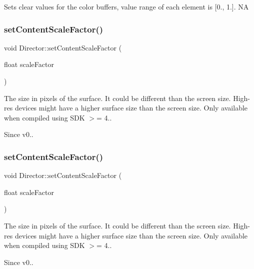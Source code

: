 Sets clear values for the color buffers, value range of each element is \mbox{[}0., 1.\mbox{]}.  NA \mbox{\label{classDirector_a0eef2543f7619fc1539a22b6cfe42acb}} 
\subsubsection{\texorpdfstring{set\+Content\+Scale\+Factor()}{setContentScaleFactor()}\hspace{0.1cm}{\footnotesize\ttfamily [1/2]}}
{\footnotesize\ttfamily void Director\+::set\+Content\+Scale\+Factor (\begin{DoxyParamCaption}\item[{float}]{scale\+Factor }\end{DoxyParamCaption})}

The size in pixels of the surface. It could be different than the screen size. High-\/res devices might have a higher surface size than the screen size. Only available when compiled using S\+DK $>$= 4.. \begin{DoxySince}{Since}
v0.. 
\end{DoxySince}
\mbox{\label{classDirector_a0eef2543f7619fc1539a22b6cfe42acb}} 
\subsubsection{\texorpdfstring{set\+Content\+Scale\+Factor()}{setContentScaleFactor()}\hspace{0.1cm}{\footnotesize\ttfamily [2/2]}}
{\footnotesize\ttfamily void Director\+::set\+Content\+Scale\+Factor (\begin{DoxyParamCaption}\item[{float}]{scale\+Factor }\end{DoxyParamCaption})}

The size in pixels of the surface. It could be different than the screen size. High-\/res devices might have a higher surface size than the screen size. Only available when compiled using S\+DK $>$= 4.. \begin{DoxySince}{Since}
v0.. 
\end{DoxySince}
\mbox{\label{classDirector_a55475c9785f74187a7d337d117224953}} 
